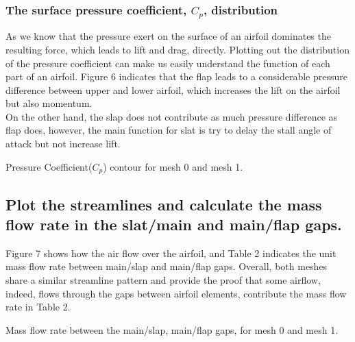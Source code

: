 \documentclass[letterpaper,onecolumn,12pt]{article}
\makeatletter
\newenvironment{tablehere}
  {\def\@captype{table}}{}
\newenvironment{figurehere}
  {\def\@captype{figure}}{}
\makeatother
\begin{document}
\subsubsection{The surface pressure coefficient, $C_p$, distribution}
As we know that the pressure exert on the surface of an airfoil dominates the resulting force, which leads to lift and drag, directly. Plotting out the distribution of the pressure coefficient can make us easily understand the function of each part of an airfoil. Figure 6 indicates that the flap leads to a considerable pressure difference between upper and lower airfoil, which increases the lift on the airfoil but also momentum.\\

On the other hand, the slap does not contribute as much pressure difference as flap does, however, the main function for slat is try to delay the stall angle of attack but not increase lift.

\begin{figurehere}
 \centering 
  \hspace{.05cm} 
  \caption{Pressure Coefficient($C_p$) contour for mesh 0 and mesh 1.} 
\end{figurehere}

\subsection{Plot the streamlines and calculate the mass flow rate in the slat/main and main/flap gaps.}

Figure 7 shows how the air flow over the airfoil, and Table 2 indicates the unit mass flow rate between main/slap and main/flap gaps. Overall, both meshes share a similar streamline pattern and provide the proof that some airflow, indeed, flows through the gaps between airfoil elements, contribute the mass flow rate in Table 2. 

\bigskip

\begin{tablehere}
\centering
{}
\qquad
{}
\caption{Mass flow rate between the main/slap, main/flap gaps, for mesh 0 and mesh 1.}
\end{tablehere}
\end{document}
